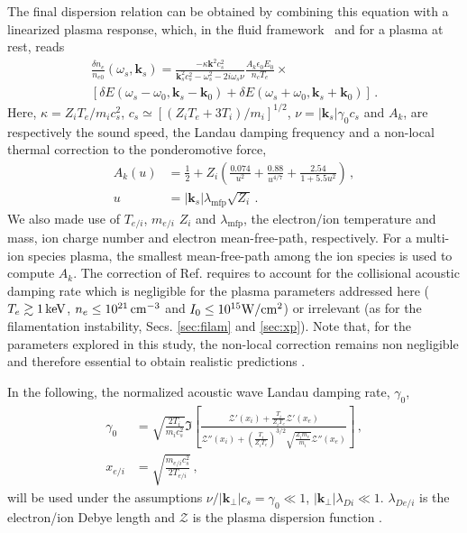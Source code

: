 \documentclass[
 reprint,
 superscriptaddress,
 amsmath,amssymb,
 aps,
]{revtex4-1}
\begin{document}
The final dispersion relation  can be obtained by combining this equation with a linearized plasma response, which, in the fluid framework~\cite{POP_Ruyer_2020} and for a plasma at rest, %
reads 
\begin{align}
   \frac{\delta n_e }{n_{e0}}(\omega_s,\mathbf{k}_s) = \frac{-\kappa\mathbf{k}^2c_s^2}{ \mathbf{k}_s^2c_s^2-\omega_s^2 -2i\omega_s \nu} \frac{A_k\epsilon_0 E_0}{n_c T_e}\times \nonumber\\ \left[\delta E(\omega_s-\omega_0, \mathbf{k}_s-\mathbf{k}_0) +\delta E(\omega_s+\omega_0, \mathbf{k}_s+\mathbf{k}_0) \right] \, .\label{eq:fluid}
\end{align}
Here, $\kappa = Z_iT_e/m_ic_s^2$,  $c_s\simeq [(Z_iT_e+3 T_i)/m_i]^{1/2}$, $\nu=\vert\mathbf{k}_s\vert \gamma_0 c_s$ and $A_k$, are respectively  the sound speed, the Landau damping frequency and a non-local thermal correction to the ponderomotive force\cite[]{Bychenkov_2000}, 
\begin{align}
     A_k(u)   &= \frac{1}{2} +Z_i\left( \frac{0.074}{u^2}+ \frac{0.88}{u^{4/7}} + \frac{2.54}{1+5.5u^2} \right) \, ,\nonumber \\ 
     u &=\vert \mathbf{k}_s \vert\lambda_\mathrm{mfp} \sqrt{Z_i}\label{eq:nl}\, .
\end{align}
We also made use of $T_{e/i}$, $m_{e/i}$ $Z_i$ and $\lambda_\mathrm{mfp}$, the electron/ion temperature and mass, ion charge number and electron mean-free-path, respectively. For a multi-ion species plasma, the smallest mean-free-path among the ion species is used to compute $A_k$.  
The correction of  Ref. \cite[]{Bychenkov_2000} requires to account for the collisional acoustic damping rate which is negligible for the plasma parameters addressed here ($T_e\gtrsim 1\,\rm keV$, $n_e\le 10^{21}\,\rm cm^{-3}$ and $I_0\le 10^{15}\rm W/cm^{2}$) or irrelevant (as for the filamentation instability, Secs.  \ref{sec:filam} and \ref{sec:xp}).
Note that, for the parameters explored in this study, the non-local correction remains non negligible and therefore essential to obtain realistic predictions \cite[]{PRL_Epperlein_1990,POP_Berger_2005}.  

In the following, 
the normalized acoustic wave Landau damping rate, $\gamma_0$, 
\begin{align}
\gamma_0 &= \sqrt{\frac{2T_i }{m_ic_s^2 }} 
\Im\left[
\frac{  \mathcal{Z}'\left(x_i\right) 
+\frac{T_i}{Z_iT_e}  \mathcal{Z}'\left(x_e\right)   }{  \mathcal{Z}''\left(x_i\right) +\left(\frac{T_i}{Z_iT_e}\right)^{3/2}\sqrt{\frac{Z_im_e}{m_i}}  \mathcal{Z}''\left(x_e\right)    }
\right]\, , \nonumber \\
x_{e/i}&=\sqrt{\frac{m_{e/i}c_s^2}{2T_{e/i}}}\, ,\label{eq:g0}
\end{align}
will be used under the assumptions  $\nu/\vert \mathbf{k}_\perp \vert c_s= \gamma_0 \ll 1$, $\vert \mathbf{k}_\perp \vert\lambda_{Di}\ll 1$.
$\lambda_{De/i}$ is the electron/ion Debye length and $ \mathcal{Z}$ is the plasma dispersion function \cite{Fried_Gell-Mann_1960}.
\end{document}
